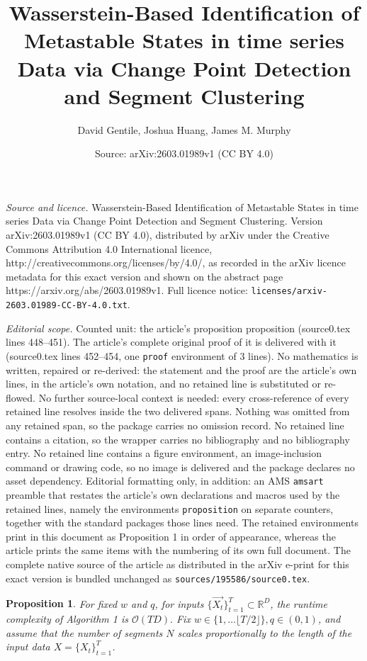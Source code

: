 \documentclass[10pt,a4paper]{amsart}
\title{Wasserstein-Based Identification of Metastable States in time series Data via Change Point Detection and Segment Clustering}
\author{David Gentile, Joshua Huang, James M. Murphy}
\date{Source: arXiv:2603.01989v1 (CC BY 4.0)}
\newtheorem{proposition}{Proposition}
\newcommand{\R}{\mathbb{R}}
\begin{document}
\maketitle

\noindent\emph{Source and licence.} Wasserstein-Based Identification of Metastable States in time series Data via Change Point Detection and Segment Clustering. Version arXiv:2603.01989v1 (CC BY 4.0), distributed by arXiv under the Creative Commons Attribution 4.0 International licence, http://creativecommons.org/licenses/by/4.0/, as recorded in the arXiv licence metadata for this exact version and shown on the abstract page https://arxiv.org/abs/2603.01989v1. Full licence notice: \texttt{licenses/arxiv-2603.01989-CC-BY-4.0.txt}.\par\smallskip

\noindent\textit{Editorial scope.} Counted unit: the article's proposition proposition (source0.tex lines 448--451). The article's complete original proof of it is delivered with it (source0.tex lines 452--454, one \texttt{proof} environment of 3 lines). No mathematics is written, repaired or re-derived: the statement and the proof are the article's own lines, in the article's own notation, and no retained line is substituted or re-flowed.  No further source-local context is needed: every cross-reference of every retained line resolves inside the two delivered spans.  Nothing was omitted from any retained span, so the package carries no omission record.  No retained line contains a citation, so the wrapper carries no bibliography and no bibliography entry.  No retained line contains a figure environment, an image-inclusion command or drawing code, so no image is delivered and the package declares no asset dependency.  Editorial formatting only, in addition: an AMS \texttt{amsart} preamble that restates the article's own declarations and macros used by the retained lines, namely the environments \texttt{proposition} on separate counters, together with the standard packages those lines need.  The retained environments print in this document as Proposition 1 in order of appearance, whereas the article prints the same items with the numbering of its own full document.  The complete native source of the article as distributed in the arXiv e-print for this exact version is bundled unchanged as \texttt{sources/195586/source0.tex}.
\begin{proposition}
For fixed \(w\) and \(q\), for inputs \(\{\vec{X_{t}}\}_{t=1}^T \subset \R^D\), the runtime complexity of Algorithm 1 is \(\mathcal{O}(TD).\)
{Fix \(w \in \{1, \dots \lfloor T/2\rfloor\}, q \in (0,1)\)}, and assume that the number of segments \(N\) scales proportionally to the length of the input data \(X = \{X_t\}_{t=1}^T\).
\end{proposition}
\end{document}
